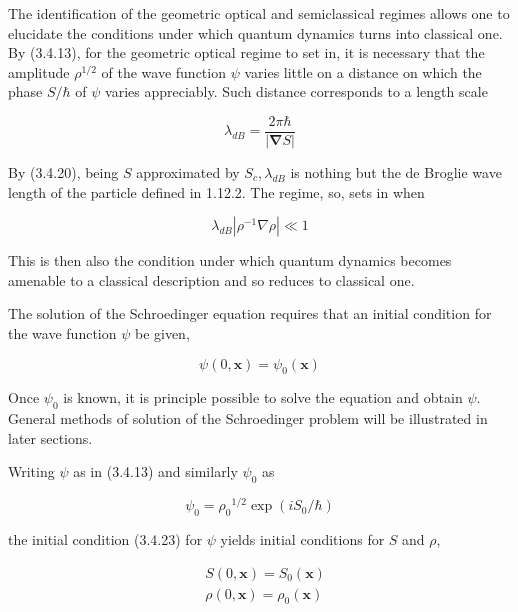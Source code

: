 \documentclass{article}
\begin{document}
The identification of the geometric optical and semiclassical regimes allows one to elucidate the conditions under which quantum dynamics turns into classical one. By (3.4.13), for the geometric optical regime to set in, it is necessary that the amplitude $\rho^{1 / 2}$ of the wave function $\psi$ varies little on a distance on which the phase $S / \hbar$ of $\psi$ varies appreciably. Such distance corresponds to a length scale
 
\begin{equation*}
\lambda_{d B}=\frac{2 \pi \hbar}{|\boldsymbol{\nabla} S|} \tag{3.4.22}
\end{equation*}
 

By (3.4.20), being $S$ approximated by $S_{c}, \lambda_{d B}$ is nothing but the de Broglie wave length of the particle defined in 1.12.2. The regime, so, sets in when
 
\begin{equation*}
\lambda_{d B}\left|\rho^{-1} \nabla \rho\right| \ll 1 \tag{3.4.23}
\end{equation*}
 

This is then also the condition under which quantum dynamics becomes amenable to a classical description and so reduces to classical one.

The solution of the Schroedinger equation requires that an initial condition for the wave function $\psi$ be given,
 
\begin{equation*}
\psi(0, \boldsymbol{x})=\psi_{0}(\boldsymbol{x}) \tag{3.4.24}
\end{equation*}
 

Once $\psi_{0}$ is known, it is principle possible to solve the equation and obtain $\psi$. General methods of solution of the Schroedinger problem will be illustrated in later sections.

Writing $\psi$ as in (3.4.13) and similarly $\psi_{0}$ as
 
\begin{equation*}
\psi_{0}=\rho_{0}{ }^{1 / 2} \exp \left(i S_{0} / \hbar\right) \tag{3.4.25}
\end{equation*}
 
the initial condition (3.4.23) for $\psi$ yields initial conditions for $S$ and $\rho$,
 
\begin{align*}
& S(0, \boldsymbol{x})=S_{0}(\boldsymbol{x})  \tag{3.4.26}\\
& \rho(0, \boldsymbol{x})=\rho_{0}(\boldsymbol{x}) \tag{3.4.27}
\end{align*}
 
\end{document}
